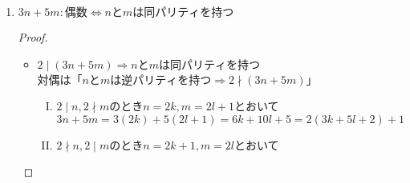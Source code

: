 \documentclass[a4paper,12pt]{ltjsarticle}
\begin{document}
\begin{enumerate}[(1)]
\begin{proof}
\begin{itemize}
\begin{enumerate}[(I)]
                            \begin{equation*}
                                n + m = 2k + 2l + 1 = 2(k + l) + 1
                            \end{equation*}
                    \end{enumerate}
                \item $2 \mid (n + m) \Leftarrow nとmは同パリティを持つ$ \\
                    \begin{enumerate}[(I)]
                        \item $2 \mid n, 2 \mid m$のとき$n = 2k, m = 2l$とおいて
                            \begin{equation*}
                                n + m = 2k + 2l = 2(k + l)
                            \end{equation*}
                        \item $2 \nmid n, 2 \nmid m$のとき$n = 2k + 1, m = 2l + 1$とおいて
                            \begin{equation*}
                                n + m = 2k + 2l + 2 = 2(k + l + 1)
                            \end{equation*}
                    \end{enumerate}
            \end{itemize}
            以上より$2 \mid (n + m) \Leftrightarrow nとmは同パリティを持つ$
        \end{proof}
    \item $3n + 5m : 偶数 \Leftrightarrow nとmは同パリティを持つ$
        \begin{proof}
            \quad \\
            \begin{itemize}
                \item $2 \mid (3n + 5m) \Rightarrow nとmは同パリティを持つ$ \\
                    対偶は「$nとmは逆パリティを持つ \Rightarrow 2 \nmid (3n + 5m)$」
                    \begin{enumerate}[(I)]
                        \item $2 \mid n, 2 \nmid m$のとき$n = 2k, m = 2l + 1$とおいて
                            \begin{equation*}
                                3n + 5m = 3(2k) + 5(2l + 1) = 6k + 10l + 5 = 2(3k + 5l + 2) + 1
                            \end{equation*}
                        \item $2 \nmid n, 2 \mid m$のとき$n = 2k + 1, m = 2l$とおいて

\end{enumerate}
\end{itemize}
\end{proof}
\end{enumerate}
\end{document}
